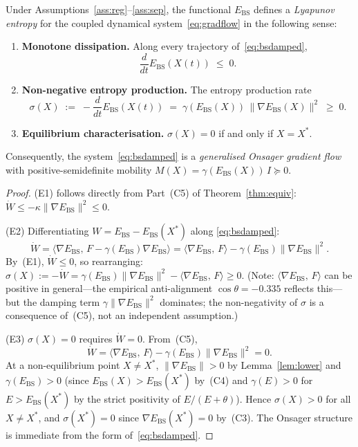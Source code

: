 \documentclass[final]{siamltex}
\newcommand{\norm}[1]{\lVert #1 \rVert}
\newcommand{\inner}[2]{\langle #1,\, #2 \rangle}
\providecommand{\grad}{\nabla}
\newcommand{\Ebs}{E_{\mathrm{BS}}}
\newcommand{\Xst}{X^*}
\newcommand{\costheta}{\cos\theta}
\begin{document}
\begin{theorem}\label{thm:entropy}
Under Assumptions~\ref{ass:reg}--\ref{ass:sep}, the functional
$\Ebs$ defines a \emph{Lyapunov entropy} for the coupled dynamical
system~\eqref{eq:gradflow} in the following sense:
\begin{enumerate}
\item[\textup{(E1)}] \textbf{Monotone dissipation.}
  Along every trajectory of~\eqref{eq:bsdamped},
  \[
    \frac{d}{dt}\Ebs(X(t)) \;\le\; 0.
  \]
\item[\textup{(E2)}] \textbf{Non-negative entropy production.}
  The entropy production rate
  \[
    \sigma(X) \;:=\; -\frac{d}{dt}\Ebs(X(t))
    \;=\; \gamma(\Ebs(X))\,\norm{\grad\Ebs(X)}^2 \;\ge\; 0.
  \]
\item[\textup{(E3)}] \textbf{Equilibrium characterisation.}
  $\sigma(X) = 0$ if and only if $X = \Xst$.
\end{enumerate}
Consequently, the system~\eqref{eq:bsdamped} is a
\emph{generalised Onsager gradient flow} with positive-semidefinite
mobility $M(X) = \gamma(\Ebs(X))\,I \succeq 0$.
\end{theorem}

\begin{proof}
(E1) follows directly from Part~(C5) of Theorem~\ref{thm:equiv}:
$\dot{W} \le -\kappa\norm{\grad\Ebs}^2 \le 0$.

(E2) Differentiating $W = \Ebs - \Ebs(\Xst)$ along
\eqref{eq:bsdamped}:
\[
  \dot{W} = \inner{\grad\Ebs}{F - \gamma(\Ebs)\grad\Ebs}
  = \inner{\grad\Ebs}{F} - \gamma(\Ebs)\norm{\grad\Ebs}^2.
\]
By~(E1), $\dot{W}\le 0$, so rearranging:
$\sigma(X) := -\dot{W} = \gamma(\Ebs)\norm{\grad\Ebs}^2
- \inner{\grad\Ebs}{F} \ge 0$.
(Note: $\inner{\grad\Ebs}{F}$ can be positive in general---the
empirical anti-alignment $\costheta = -0.335$ reflects this---but
the damping term $\gamma\norm{\grad\Ebs}^2$ dominates; the
non-negativity of $\sigma$ is a consequence of~(C5), not an
independent assumption.)

(E3) $\sigma(X)=0$ requires $\dot{W} = 0$. From~(C5),
\[
  \dot{W}
  = \inner{\grad\Ebs}{F} - \gamma(\Ebs)\norm{\grad\Ebs}^2 = 0.
\]
At a non-equilibrium point $X \neq \Xst$,
$\norm{\grad\Ebs} > 0$ by Lemma~\ref{lem:lower} and
$\gamma(\Ebs) > 0$ (since $\Ebs(X) > \Ebs(\Xst)$ by~(C4) and
$\gamma(E) > 0$ for $E > \Ebs(\Xst)$ by the strict positivity
of $E/(E{+}\theta)$).  Hence $\sigma(X) > 0$ for all
$X \neq \Xst$, and $\sigma(\Xst) = 0$ since
$\grad\Ebs(\Xst) = 0$ by~(C3).
The Onsager structure is immediate from the form of~\eqref{eq:bsdamped}.
\end{proof}
\end{document}
